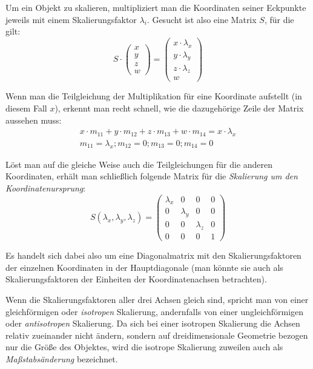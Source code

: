 Um ein Objekt zu skalieren, multipliziert man die Koordinaten seiner Eckpunkte jeweils mit einem Skalierungsfaktor $\lambda_i$. Gesucht ist also eine Matrix $S$, für die gilt:
\begin{equation}
 S \cdot
 \begin{pmatrix}
  x \\
  y \\
  z \\
  w
 \end{pmatrix}
 =
 \begin{pmatrix}
  x \cdot \lambda_x \\
  y \cdot \lambda_y \\
  z \cdot \lambda_z \\
  w
 \end{pmatrix}
\end{equation}

Wenn man die Teilgleichung der Multiplikation für eine Koordinate aufstellt (in diesem Fall $x$), erkennt man recht schnell, wie die dazugehörige Zeile der Matrix aussehen muss:
\begin{equation}
\begin{split}
 x \cdot m_{11} + y \cdot m_{12} + z \cdot m_{13} + w \cdot m_{14} = x \cdot \lambda_x \\
 m_{11} = \lambda_x; m_{12} = 0; m_{13} = 0; m_{14} = 0
\end{split}
\end{equation}

Löst man auf die gleiche Weise auch die Teilgleichungen für die anderen Koordinaten, erhält man schließlich folgende Matrix für die \emph{Skalierung um den Koordinatenursprung}:
\begin{equation}
\label{scalingmatrix}
 S{(\lambda_x, \lambda_y, \lambda_z)} =
 \begin{pmatrix}
  \lambda_x & 0 & 0 & 0 \\
  0 & \lambda_y & 0 & 0 \\
  0 & 0 & \lambda_z & 0 \\
  0 & 0 & 0 & 1
 \end{pmatrix}
\end{equation}

Es handelt sich dabei also um eine Diagonalmatrix mit den Skalierungsfaktoren der einzelnen Koordinaten in der Hauptdiagonale (man könnte sie auch als Skalierungsfaktoren der Einheiten der Koordinatenachsen betrachten).

Wenn die Skalierungsfaktoren aller drei Achsen gleich sind, spricht man von einer gleichförmigen oder \emph{isotropen} Skalierung, andernfalls von einer ungleichförmigen oder \emph{antisotropen} Skalierung. Da sich bei einer isotropen Skalierung die Achsen relativ zueinander nicht ändern, sondern auf dreidimensionale Geometrie bezogen nur die Größe des Objektes, wird die isotrope Skalierung zuweilen auch als \emph{Maßstabsänderung} bezeichnet.

